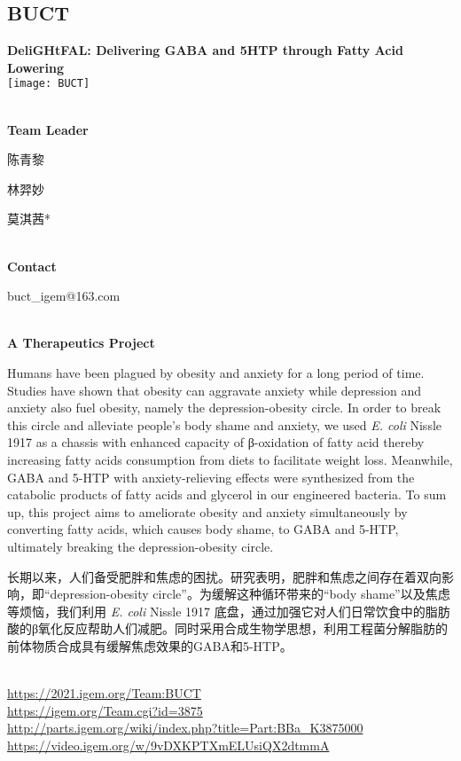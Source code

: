 \subsection{\textcolor{Blu}{ BUCT } }
\vspace{5mm}
\begin{center}
\large{
  \textbf{ DeliGHtFAL: Delivering GABA and 5HTP through Fatty Acid Lowering }\\

  \texttt{[image: BUCT]}
}
\end{center}
\textbf{\\Team Leader}

  陈青黎

  林羿妙

  莫淇茜*


\textbf{\\Contact}

  buct\_igem@163.com


\textbf{\\A Therapeutics Project\\}\begin{spacing}{1.5}

Humans have been plagued by obesity and anxiety for a long period of time. Studies have shown that obesity can aggravate anxiety while depression and anxiety also fuel obesity, namely the depression-obesity circle. In order to break this circle and alleviate people's body shame and anxiety, we used \textit{E. coli} Nissle 1917 as a chassis with enhanced capacity of β-oxidation of fatty acid thereby increasing fatty acids consumption from diets to facilitate weight loss. Meanwhile, GABA and 5-HTP with anxiety-relieving effects were synthesized from the catabolic products of fatty acids and glycerol in our engineered bacteria. To sum up, this project aims to ameliorate obesity and anxiety simultaneously by converting fatty acids, which causes body shame, to GABA and 5-HTP, ultimately breaking the depression-obesity circle.

长期以来，人们备受肥胖和焦虑的困扰。研究表明，肥胖和焦虑之间存在着双向影响，即“depression-obesity circle”。为缓解这种循环带来的“body shame”以及焦虑等烦恼，我们利用 \textit{E. coli} Nissle 1917 底盘，通过加强它对人们日常饮食中的脂肪酸的β氧化反应帮助人们减肥。同时采用合成生物学思想，利用工程菌分解脂肪的前体物质合成具有缓解焦虑效果的GABA和5-HTP。\end{spacing}
\\

\url{https://2021.igem.org/Team:BUCT }\\
\url{https://igem.org/Team.cgi?id=3875 }\\
\url{http://parts.igem.org/wiki/index.php?title=Part:BBa_K3875000 }\\
\url{https://video.igem.org/w/9vDXKPTXmELUsiQX2dtmmA }\\

